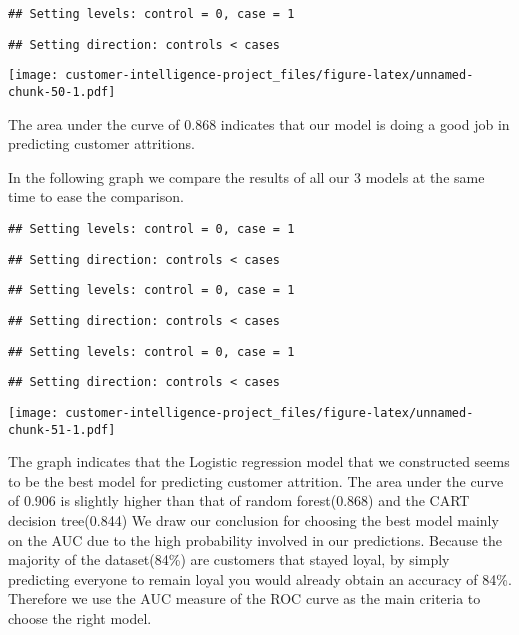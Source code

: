 \documentclass[
]{article}
\begin{document}
\begin{verbatim}
## Setting levels: control = 0, case = 1
\end{verbatim}

\begin{verbatim}
## Setting direction: controls < cases
\end{verbatim}

\texttt{[image: customer-intelligence-project\_files/figure-latex/unnamed-chunk-50-1.pdf]}

The area under the curve of 0.868 indicates that our model is doing a
good job in predicting customer attritions.

In the following graph we compare the results of all our 3 models at the
same time to ease the comparison.

\begin{verbatim}
## Setting levels: control = 0, case = 1
\end{verbatim}

\begin{verbatim}
## Setting direction: controls < cases
\end{verbatim}

\begin{verbatim}
## Setting levels: control = 0, case = 1
\end{verbatim}

\begin{verbatim}
## Setting direction: controls < cases
\end{verbatim}

\begin{verbatim}
## Setting levels: control = 0, case = 1
\end{verbatim}

\begin{verbatim}
## Setting direction: controls < cases
\end{verbatim}

\texttt{[image: customer-intelligence-project\_files/figure-latex/unnamed-chunk-51-1.pdf]}

The graph indicates that the Logistic regression model that we
constructed seems to be the best model for predicting customer
attrition. The area under the curve of 0.906 is slightly higher than
that of random forest(0.868) and the CART decision tree(0.844) We draw
our conclusion for choosing the best model mainly on the AUC due to the
high probability involved in our predictions. Because the majority of
the dataset(84\%) are customers that stayed loyal, by simply predicting
everyone to remain loyal you would already obtain an accuracy of 84\%.
Therefore we use the AUC measure of the ROC curve as the main criteria
to choose the right model.
\end{document}
